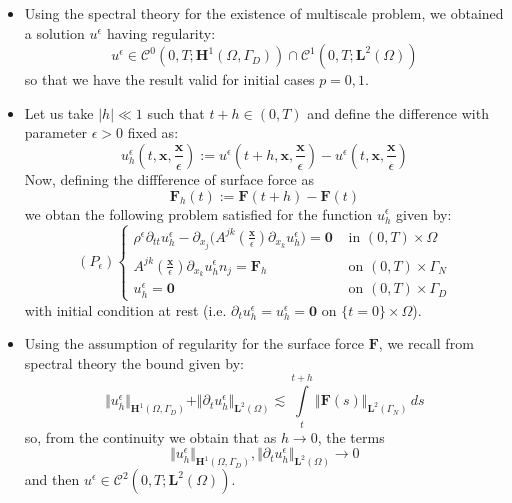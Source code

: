 \begin{itemize}
    \item Using the spectral theory for the existence of multiscale problem, we obtained a solution $u^{\epsilon}$ having regularity:
    \begin{equation*}
        u^{\epsilon} \in \mathcal{C}^0(0,T;\mathbf{H}^1(\Omega, \Gamma_D)) \cap \mathcal{C}^1(0,T;\mathbf{L}^2(\Omega))
    \end{equation*}
    so that we have the result valid for initial cases $p = 0, 1$.
    \item Let us take $\vert h \vert \ll 1$ such that $t+h \in (0,T)$ and define the difference with parameter $\epsilon > 0$ fixed as:
    \begin{equation*}
        u_h^{\epsilon}(t, \mathbf{x}, \frac{\mathbf{x}}{\epsilon}) := u^{\epsilon} (t+h, \mathbf{x}, \frac{\mathbf{x}}{\epsilon}) - u^{\epsilon}(t, \mathbf{x}, \frac{\mathbf{x}}{\epsilon})
    \end{equation*}
    Now, defining the diffference of surface force as
    \begin{equation*}
        \mathbf{F}_h(t):= \mathbf{F}(t+h) - \mathbf{F}(t)
    \end{equation*}
    we obtan the following problem satisfied for the function $u_h^{\epsilon}$ given by:
    \begin{equation*}
        (P_{\epsilon}) \left \{
        \begin{array}{cc}
            \rho^{\epsilon} \partial_{tt} u_h^{\epsilon} - \partial_{x_j} \big( A^{jk}(\frac{\mathbf{x}}{\epsilon}) \partial_{x_k} u_h^{\epsilon} \big) = \mathbf{0}  &  \text{ in } (0,T)\times \Omega \\
            A^{jk}(\frac{\mathbf{x}}{\epsilon}) \partial_{x_k} u_h^{\epsilon}n_j = \mathbf{F}_h & \text{ on } (0,T)\times \Gamma_N \\
            u^{\epsilon}_h = \mathbf{0} & \text{ on }(0,T)\times \Gamma_D
        \end{array}
        \right .
    \end{equation*}
    with initial condition at rest (i.e. $\partial_t u_h^{\epsilon} = u_h^{\epsilon} = \mathbf{0}$ on $\{t=0\} \times \Omega$).
    
    
    \item Using the assumption of regularity for the surface force $\mathbf{F}$, we recall from spectral theory the bound given by:
    \begin{equation*}
        \Vert u_h^{\epsilon} \Vert_{\mathbf{H}^1(\Omega, \Gamma_D)} + \Vert \partial_t u_h^{\epsilon}\Vert_{\mathbf{L}^2(\Omega)} \lesssim \int \limits_t^{t+h} \Vert \mathbf{F}(s) \Vert_{\mathbf{L}^2(\Gamma_N)} \, ds
    \end{equation*}
    so, from the continuity we obtain that as $h \rightarrow 0$, the terms 
    \begin{equation*}
        \Vert u_h^{\epsilon} \Vert_{\mathbf{H}^1(\Omega, \Gamma_D)}, \Vert \partial_t u_h^{\epsilon} \Vert_{\mathbf{L}^2 (\Omega)} \rightarrow 0
    \end{equation*}
    and then $u^{\epsilon} \in \mathcal{C}^2(0,T; \mathbf{L}^2(\Omega))$.
    

\end{itemize}
